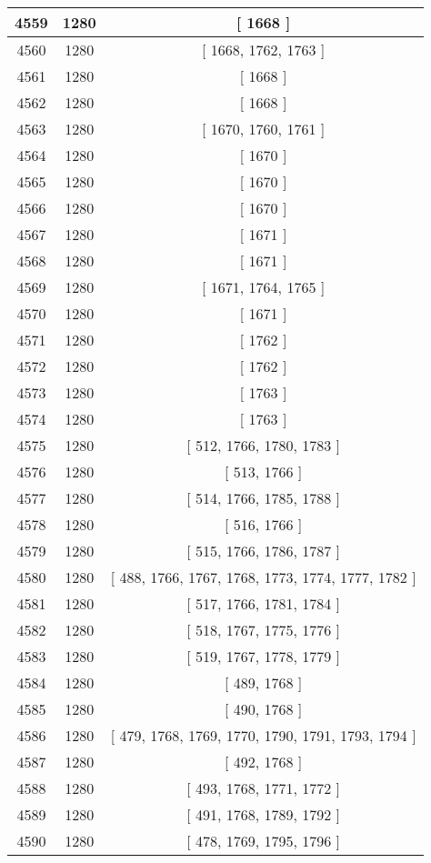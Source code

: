 \begin{center}
\begin{longtable}[H]{|| c c c ||}
\hline
4559 & 1280 & [ 1668 ] \\ 
\hline
4560 & 1280 & [ 1668, 1762, 1763 ] \\ 
\hline
4561 & 1280 & [ 1668 ] \\ 
\hline
4562 & 1280 & [ 1668 ] \\ 
\hline
4563 & 1280 & [ 1670, 1760, 1761 ] \\ 
\hline
4564 & 1280 & [ 1670 ] \\ 
\hline
4565 & 1280 & [ 1670 ] \\ 
\hline
4566 & 1280 & [ 1670 ] \\ 
\hline
4567 & 1280 & [ 1671 ] \\ 
\hline
4568 & 1280 & [ 1671 ] \\ 
\hline
4569 & 1280 & [ 1671, 1764, 1765 ] \\ 
\hline
4570 & 1280 & [ 1671 ] \\ 
\hline
4571 & 1280 & [ 1762 ] \\ 
\hline
4572 & 1280 & [ 1762 ] \\ 
\hline
4573 & 1280 & [ 1763 ] \\ 
\hline
4574 & 1280 & [ 1763 ] \\ 
\hline
4575 & 1280 & [ 512, 1766, 1780, 1783 ] \\ 
\hline
4576 & 1280 & [ 513, 1766 ] \\ 
\hline
4577 & 1280 & [ 514, 1766, 1785, 1788 ] \\ 
\hline
4578 & 1280 & [ 516, 1766 ] \\ 
\hline
4579 & 1280 & [ 515, 1766, 1786, 1787 ] \\ 
\hline
4580 & 1280 & [ 488, 1766, 1767, 1768, 1773, 1774, 1777, 1782 ] \\ 
\hline
4581 & 1280 & [ 517, 1766, 1781, 1784 ] \\ 
\hline
4582 & 1280 & [ 518, 1767, 1775, 1776 ] \\ 
\hline
4583 & 1280 & [ 519, 1767, 1778, 1779 ] \\ 
\hline
4584 & 1280 & [ 489, 1768 ] \\ 
\hline
4585 & 1280 & [ 490, 1768 ] \\ 
\hline
4586 & 1280 & [ 479, 1768, 1769, 1770, 1790, 1791, 1793, 1794 ] \\ 
\hline
4587 & 1280 & [ 492, 1768 ] \\ 
\hline
4588 & 1280 & [ 493, 1768, 1771, 1772 ] \\ 
\hline
4589 & 1280 & [ 491, 1768, 1789, 1792 ] \\ 
\hline
4590 & 1280 & [ 478, 1769, 1795, 1796 ] \\ 

\end{longtable}
\end{center}
